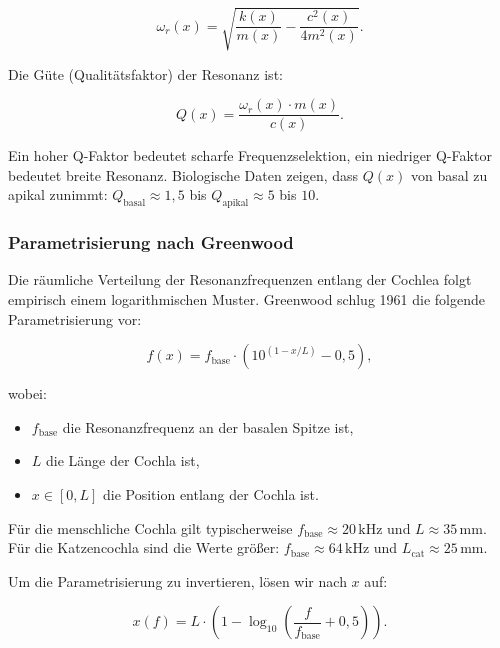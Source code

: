 ﻿\documentclass[12pt, a4paper]{article}
\theoremstyle{definition}
\theoremstyle{remark}
\begin{document}
\begin{equation}
\label{eq:resonance_freq}
\omega_r(x) = \sqrt{\frac{k(x)}{m(x)} - \frac{c^2(x)}{4m^2(x)}}.
\end{equation}

Die Güte (Qualitätsfaktor) der Resonanz ist:

\begin{equation}
\label{eq:q_factor}
Q(x) = \frac{\omega_r(x) \cdot m(x)}{c(x)}.
\end{equation}

Ein hoher Q-Faktor bedeutet scharfe Frequenzselektion, ein niedriger Q-Faktor 
bedeutet breite Resonanz. Biologische Daten zeigen, dass $Q(x)$ von basal 
zu apikal zunimmt: $Q_{\mathrm{basal}} \approx 1{,}5$ bis $Q_{\mathrm{apikal}} 
\approx 5$ bis $10$.

\subsubsection{Parametrisierung nach Greenwood}

Die räumliche Verteilung der Resonanzfrequenzen entlang der Cochlea folgt 
empirisch einem logarithmischen Muster. Greenwood schlug 1961 die folgende 
Parametrisierung vor:

\begin{equation}
\label{eq:greenwood_map}
f(x) = f_{\mathrm{base}} \cdot \left( 10^{(1-x/L)} - 0{,}5 \right),
\end{equation}

wobei:
\begin{itemize}
\item $f_{\mathrm{base}}$ die Resonanzfrequenz an der basalen Spitze ist,
\item $L$ die Länge der Cochla ist,
\item $x \in [0, L]$ die Position entlang der Cochla ist.
\end{itemize}

Für die menschliche Cochla gilt typischerweise $f_{\mathrm{base}} \approx 20\,\mathrm{kHz}$ 
und $L \approx 35\,\mathrm{mm}$. Für die Katzencochla sind die Werte größer: 
$f_{\mathrm{base}} \approx 64\,\mathrm{kHz}$ und $L_{\mathrm{cat}} \approx 25\,\mathrm{mm}$.

Um die Parametrisierung zu invertieren, lösen wir nach $x$ auf:

\begin{equation}
\label{eq:greenwood_inverse}
x(f) = L \cdot \left( 1 - \log_{10}\left( \frac{f}{f_{\mathrm{base}}} + 0{,}5 \right) \right).
\end{equation}
\end{document}
